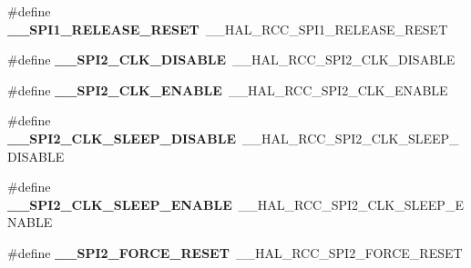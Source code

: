 \begin{DoxyCompactItemize}
\item 
\#define {\bfseries \+\_\+\+\_\+\+S\+P\+I1\+\_\+\+R\+E\+L\+E\+A\+S\+E\+\_\+\+R\+E\+S\+ET}~\+\_\+\+\_\+\+H\+A\+L\+\_\+\+R\+C\+C\+\_\+\+S\+P\+I1\+\_\+\+R\+E\+L\+E\+A\+S\+E\+\_\+\+R\+E\+S\+ET\hypertarget{group___h_a_l___r_c_c___aliased_gad44d06addea92043b0baf1add7ec7d5b}{}\label{group___h_a_l___r_c_c___aliased_gad44d06addea92043b0baf1add7ec7d5b}

\item 
\#define {\bfseries \+\_\+\+\_\+\+S\+P\+I2\+\_\+\+C\+L\+K\+\_\+\+D\+I\+S\+A\+B\+LE}~\+\_\+\+\_\+\+H\+A\+L\+\_\+\+R\+C\+C\+\_\+\+S\+P\+I2\+\_\+\+C\+L\+K\+\_\+\+D\+I\+S\+A\+B\+LE\hypertarget{group___h_a_l___r_c_c___aliased_ga64cc32462513227e3da046275f99a3ad}{}\label{group___h_a_l___r_c_c___aliased_ga64cc32462513227e3da046275f99a3ad}

\item 
\#define {\bfseries \+\_\+\+\_\+\+S\+P\+I2\+\_\+\+C\+L\+K\+\_\+\+E\+N\+A\+B\+LE}~\+\_\+\+\_\+\+H\+A\+L\+\_\+\+R\+C\+C\+\_\+\+S\+P\+I2\+\_\+\+C\+L\+K\+\_\+\+E\+N\+A\+B\+LE\hypertarget{group___h_a_l___r_c_c___aliased_ga37312dc0b6032476ee2a0bde4d4c601c}{}\label{group___h_a_l___r_c_c___aliased_ga37312dc0b6032476ee2a0bde4d4c601c}

\item 
\#define {\bfseries \+\_\+\+\_\+\+S\+P\+I2\+\_\+\+C\+L\+K\+\_\+\+S\+L\+E\+E\+P\+\_\+\+D\+I\+S\+A\+B\+LE}~\+\_\+\+\_\+\+H\+A\+L\+\_\+\+R\+C\+C\+\_\+\+S\+P\+I2\+\_\+\+C\+L\+K\+\_\+\+S\+L\+E\+E\+P\+\_\+\+D\+I\+S\+A\+B\+LE\hypertarget{group___h_a_l___r_c_c___aliased_gac77dfd862a3f8a848bad3f5d02822003}{}\label{group___h_a_l___r_c_c___aliased_gac77dfd862a3f8a848bad3f5d02822003}

\item 
\#define {\bfseries \+\_\+\+\_\+\+S\+P\+I2\+\_\+\+C\+L\+K\+\_\+\+S\+L\+E\+E\+P\+\_\+\+E\+N\+A\+B\+LE}~\+\_\+\+\_\+\+H\+A\+L\+\_\+\+R\+C\+C\+\_\+\+S\+P\+I2\+\_\+\+C\+L\+K\+\_\+\+S\+L\+E\+E\+P\+\_\+\+E\+N\+A\+B\+LE\hypertarget{group___h_a_l___r_c_c___aliased_gac05baf49d88f18c0f641dca961464abe}{}\label{group___h_a_l___r_c_c___aliased_gac05baf49d88f18c0f641dca961464abe}

\item 
\#define {\bfseries \+\_\+\+\_\+\+S\+P\+I2\+\_\+\+F\+O\+R\+C\+E\+\_\+\+R\+E\+S\+ET}~\+\_\+\+\_\+\+H\+A\+L\+\_\+\+R\+C\+C\+\_\+\+S\+P\+I2\+\_\+\+F\+O\+R\+C\+E\+\_\+\+R\+E\+S\+ET\hypertarget{group___h_a_l___r_c_c___aliased_gae187d618acdf2464672bf0b18c34e5cd}{}\label{group___h_a_l___r_c_c___aliased_gae187d618acdf2464672bf0b18c34e5cd}


\end{DoxyCompactItemize}
